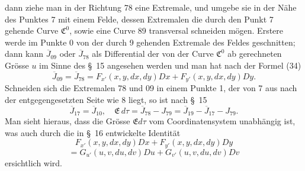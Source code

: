 \documentclass[11pt,a4paper,leqno]{article}
\begin{document}
 dann ziehe man in der Richtung 78 eine Extremale, und umgebe sie in der Nähe des Punktes 7 mit einem Felde, dessen Extremalen die durch den Punkt 7 gehende Curve $\mathfrak{C}^0$, sowie eine Curve 89 transversal schneiden mögen. Erstere werde im Punkte 0 von der durch 9 gehenden Extremale des Feldes geschnitten; dann kann $\overline{J}_{09}$ oder $\overline{J}_{78}$ als Differential der von der Curve $\mathfrak{C}^0$ ab gerechneten Grösse $u$ im Sinne des
\S~15 angesehen werden und man hat nach der Formel (34)
\[
\overline{J}_{09}=\overline{J}_{78}
=
F_{x'}(x,y,dx,dy)D x+F_{y'}(x,y,dx,dy)D y.
\]
Schneiden sich die Extremalen 78 und 09 in einem Punkte 1, der von 7 aus nach der entgegengesetzten Seite wie 8 liegt, so ist nach \S~15
\[
\overline{J}_{17}=\overline{J}_{10},\quad
\mathfrak{E}\,d\tau
=
\overline{J}_{78}-J_{79}
=
\overline{J}_{19}-\overline{J}_{17}-J_{79}.
\]
Man sieht hieraus, dass die Grösse $\mathfrak{E}d\tau$ vom Coordinatensystem unabhängig ist, was auch durch die in \S~16 entwickelte Identität
\[
F_{x'}(x,y,dx,dy)D x+F_{y'}(x,y,dx,dy)D y
\]
\[
=
G_{u'}(u,v,du,dv)D u+G_{v'}(u,v,du,dv)D v
\]
ersichtlich wird.
\end{document}
